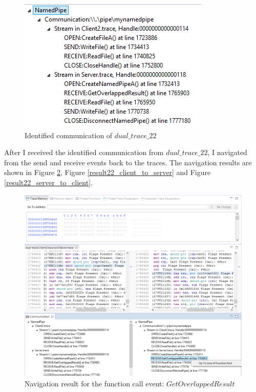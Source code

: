 \documentclass[12pt,oneside]{book}
\providecommand{\DIFaddbeginFL}{} %
\providecommand{\DIFaddendFL}{} %
\providecommand{\DIFdelbeginFL}{} %
\providecommand{\DIFdelendFL}{} %
\newcommand{\DIFscaledelfig}{0.5}
\newlength{\DIFdelgraphicswidth} %
\newlength{\DIFdelgraphicsheight} %
\newcommand{\DIFaddincludegraphics}[2][]{{\color{blue}\fbox{\DIFOincludegraphics[#1]{#2}}}} %
\newcommand{\DIFdelincludegraphics}[2][]{%
\sbox{\DIFdelgraphicsbox}{\DIFOincludegraphics[#1]{#2}}%
\settoboxwidth{\DIFdelgraphicswidth}{\DIFdelgraphicsbox} %
\settoboxtotalheight{\DIFdelgraphicsheight}{\DIFdelgraphicsbox} %
\scalebox{\DIFscaledelfig}{%
\parbox[b]{\DIFdelgraphicswidth}{\usebox{\DIFdelgraphicsbox}\\[-\baselineskip] \rule{\DIFdelgraphicswidth}{0em}}\llap{\resizebox{\DIFdelgraphicswidth}{\DIFdelgraphicsheight}{%
\setlength{\unitlength}{\DIFdelgraphicswidth}%
\begin{picture}(1,1)%
\thicklines\linethickness{2pt} %
{\color[rgb]{1,0,0}\put(0,0){\framebox(1,1){}}}%
{\color[rgb]{1,0,0}\put(0,0){\line( 1,1){1}}}%
{\color[rgb]{1,0,0}\put(0,1){\line(1,-1){1}}}%
\end{picture}%
}\hspace*{3pt}}} %
} %
\DeclareRobustCommand{\DIFaddbeginFL}{\DIFOaddbeginFL \let\includegraphics\DIFaddincludegraphics} %
\DeclareRobustCommand{\DIFaddendFL}{\DIFOaddendFL \let\includegraphics\DIFOincludegraphics} %
\DeclareRobustCommand{\DIFdelbeginFL}{\DIFOdelbeginFL \let\includegraphics\DIFdelincludegraphics} %
\DeclareRobustCommand{\DIFdelendFL}{\DIFOaddendFL \let\includegraphics\DIFOincludegraphics} %
\begin{document}
\begin{figure}[H]
\centerline{\includegraphics{Figures/result22_communications}}
 \caption{Identified communication of $dual\_trace\_22$}
\label{result22_communications}
\end{figure}

After I received the identified communication from $dual\_trace\_22$, I navigated from the send and receive events back to the traces. The navigation results are shown in Figure \ref{result22_server_readnull}, Figure \ref{result22_client_to_server} and Figure \ref{result22_server_to_client}.

\begin{figure}[H]
\DIFdelbeginFL %
\DIFdelendFL \DIFaddbeginFL \centerline{\includegraphics[scale=0.7]{Figures/result22_server_readnull}}
 \DIFaddendFL \caption{Navigation result for the function call event: $GetOverlappedResult$}
\label{result22_server_readnull}
\end{figure}
\end{document}
